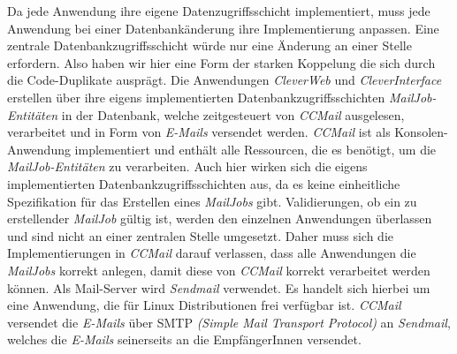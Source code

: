 Da jede Anwendung ihre eigene Datenzugriffsschicht implementiert, muss jede Anwendung bei einer Datenbankänderung ihre Implementierung anpassen. Eine zentrale Datenbankzugriffsschicht würde nur eine Änderung an einer Stelle erfordern. Also haben wir hier eine Form der starken Koppelung die sich durch die Code-Duplikate ausprägt.
\newline
\newline
Die Anwendungen \emph{CleverWeb} und \emph{CleverInterface} erstellen über ihre eigens implementierten Datenbankzugriffsschichten \emph{MailJob-Entitäten} in der Datenbank, welche zeitgesteuert von \emph{CCMail} ausgelesen, verarbeitet und in Form von \emph{E-Mails} versendet werden. \emph{CCMail} ist als Konsolen-Anwendung implementiert und enthält alle Ressourcen, die es benötigt, um die \emph{MailJob-Entitäten} zu verarbeiten. Auch hier wirken sich die eigens implementierten Datenbankzugriffsschichten aus, da es keine einheitliche Spezifikation für das Erstellen eines \emph{MailJobs} gibt. Validierungen, ob ein zu erstellender \emph{MailJob} gültig ist, werden den einzelnen Anwendungen überlassen und sind nicht an einer zentralen Stelle umgesetzt. Daher muss sich die Implementierungen in \emph{CCMail} darauf verlassen, dass alle Anwendungen die \emph{MailJobs} korrekt anlegen, damit diese von \emph{CCMail} korrekt verarbeitet werden können.
\newline
\newline
Als Mail-Server wird \emph{Sendmail} verwendet. Es handelt sich hierbei um eine Anwendung, die für Linux Distributionen frei verfügbar ist. \emph{CCMail} versendet die \emph{E-Mails} über SMTP \emph{(Simple Mail Transport Protocol)} an \emph{Sendmail}, welches die \emph{E-Mails} seinerseits an die EmpfängerInnen versendet.

\newpage
